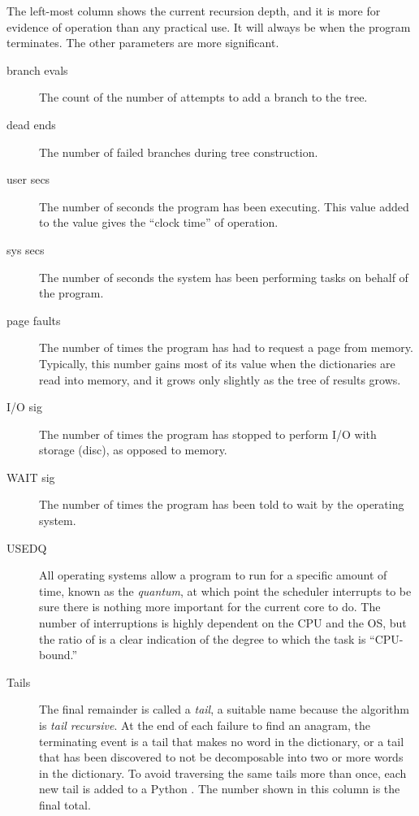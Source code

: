\documentclass[letterpaper, 11pt]{article}
\begin{document}
The left-most column shows the current recursion depth, and it is more for
evidence of operation than any practical use. It will always be  when
the program terminates. The other parameters are more significant.

\begin{description}
\item[branch evals] The count of the number of attempts to add a branch
to the tree.

\item[dead ends] The number of failed branches during tree construction.

\item[user secs] The number of seconds the program has been executing.
This value added to the  value gives the ``clock time''
of operation.

\item[sys secs] The number of seconds the system has been performing
tasks on behalf of the program.

\item[page faults] The number of times the program has had to request 
a page from memory. Typically, this number gains most of its value when the
dictionaries are read into memory, and it grows only slightly as the
tree of results grows.

\item[I/O sig] The number of times the program has stopped to perform
I/O with storage (disc), as opposed to memory.

\item[WAIT sig] The number of times the program has been told to wait
by the operating system.

\item[USEDQ] All operating systems allow a program to run for a specific
amount of time, known as the \emph{quantum}, at which point the scheduler
interrupts to be sure there is nothing more important for the current 
core to do. The number of interruptions is highly dependent on the 
CPU and the OS, but the ratio of  is a 
clear indication of the degree to which the task is ``CPU-bound.''

\item[Tails] The final remainder is called a \emph{tail}, a suitable
name because the algorithm is \emph{tail recursive}. At the end
of each failure to find an anagram, the terminating event is a 
tail that makes no word in the dictionary, or a tail that has
been discovered to not be decomposable into two or more words
in the dictionary. To avoid traversing the same tails more than
once, each new tail is added to a Python . The number
shown in this column is the final total.

\end{description}
\end{document}
